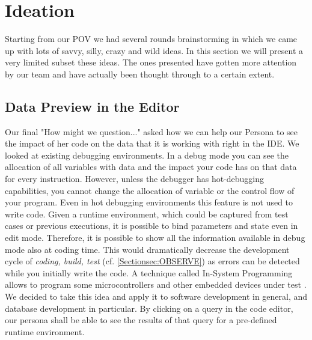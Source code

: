 
\section{Ideation}
\label{sec:IDEATION}

Starting from our POV we had several rounds brainstorming in which we came up with lots of savvy, silly, crazy and wild ideas. In this section we will present a very limited subset these ideas. The ones presented have gotten more attention by our team and have actually been thought through to a certain extent.

\subsection{Data Preview in the Editor}
Our final "How might we question..." asked how we can help our Persona to see the impact of her code on the data that it is working with right in the IDE. We looked at existing debugging environments. In a debug mode you can see the allocation of all variables with data and the impact your code has on that data for every instruction. However, unless the debugger has hot-debugging capabilities, you cannot change the allocation of variable or the control flow of your program. Even in hot debugging environments this feature is not used to write code.
Given a runtime environment, which could be captured from test cases or previous executions, it is possible to bind parameters and state even in edit mode. Therefore, it is possible to show all the information available in debug mode also at coding time. This would dramatically decrease the development cycle of \textit{coding, build, test} (cf. \ref{Sectionsec:OBSERVE}) as errors can be detected while you initially write the code. A technique called In-System Programming allows to program some microcontrollers and other embedded devices under test \cite{herrmann2002apparatus}.
We decided to take this idea and apply it to software development in general, and database development in particular.  By clicking on a query in the code editor, our persona shall be able to see the results of that query for a pre-defined runtime environment.


